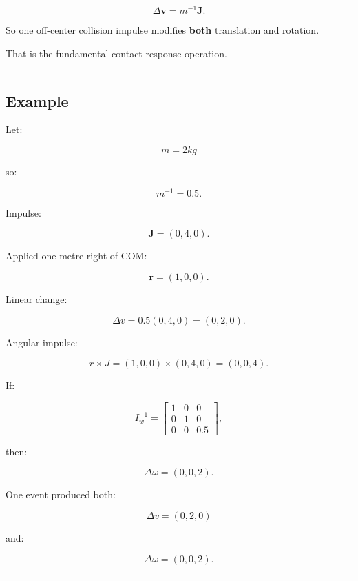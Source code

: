 \[
\boxed{
\Delta\mathbf v
=
m^{-1}\mathbf J.
}
\]

So one off-center collision impulse modifies \textbf{both} translation and rotation.

That is the fundamental contact-response operation.

\begin{center}\rule{0.5\linewidth}{0.5pt}\end{center}

\begin{allmightroleexample}

\subsection{Example}\label{06-engine-ii-ch036-example}

\hypertarget{06-engine-ii-ch036-example}{}

Let:

\end{allmightroleexample}

\[
m=2kg
\]

so:

\[
m^{-1}=0.5.
\]

Impulse:

\[
\mathbf J=(0,4,0).
\]

Applied one metre right of COM:

\[
\mathbf r=(1,0,0).
\]

Linear change:

\[
\Delta v
=
0.5(0,4,0)
=
(0,2,0).
\]

Angular impulse:

\[
r\times J
=
(1,0,0)\times(0,4,0)
=
(0,0,4).
\]

If:

\[
I_w^{-1}
=
\begin{bmatrix}
1&0&0\\
0&1&0\\
0&0&0.5
\end{bmatrix},
\]

then:

\[
\Delta\omega
=
(0,0,2).
\]

One event produced both:

\[
\Delta v=(0,2,0)
\]

and:

\[
\Delta\omega=(0,0,2).
\]

\begin{center}\rule{0.5\linewidth}{0.5pt}\end{center}


